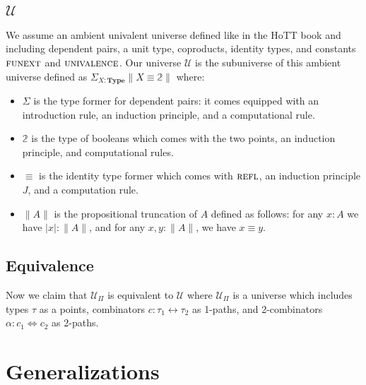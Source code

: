 \documentclass[format=acmlarge,review,natbib]{acmart}
\newcommand{\reflp}{\textsc{refl}}
\newcommand{\iso}{\leftrightarrow}
\newcommand{\isotwo}{\Leftrightarrow}
\begin{document}
\subsection{$\mathcal{U}$}

We assume an ambient univalent universe defined like in the HoTT book and including dependent pairs, a unit type, coproducts, identity types, and constants $\textsc{funext}$ and $\textsc{univalence}$. Our universe $\mathcal{U}$ is the subuniverse of this ambient universe defined as $\Sigma_{X:\mathbf{Type}} \| X \equiv \mathbb{2} \|$ where:

\begin{itemize}

\item $\Sigma$ is the type former for dependent pairs: it comes equipped with an introduction rule, an induction principle, and a computational rule.

\item $\mathbb{2}$ is the type of booleans which comes with the two points, an induction principle, and computational rules.

\item $\equiv$ is the identity type former which comes with $\reflp$, an induction principle $J$, and a computation rule.

\item $\| A \|$ is the propositional truncation of $A$ defined as follows: for
  any $x:A$ we have $|x| : \|A\|$, and for any $x,y : \|A\|$, we have $x \equiv y$.

\end{itemize}

\subsection{Equivalence}

Now we claim that $\mathcal{U}_\Pi$ is equivalent to $\mathcal{U}$ where $\mathcal{U}_\Pi$ is a universe which includes types $\tau$ as a points, combinators $c : \tau_1 \iso \tau_2$ as 1-paths, and 2-combinators $\alpha : c_1 \isotwo c_2$ as 2-paths.

\section{Generalizations}



{\footnotesize

}
\end{document}
